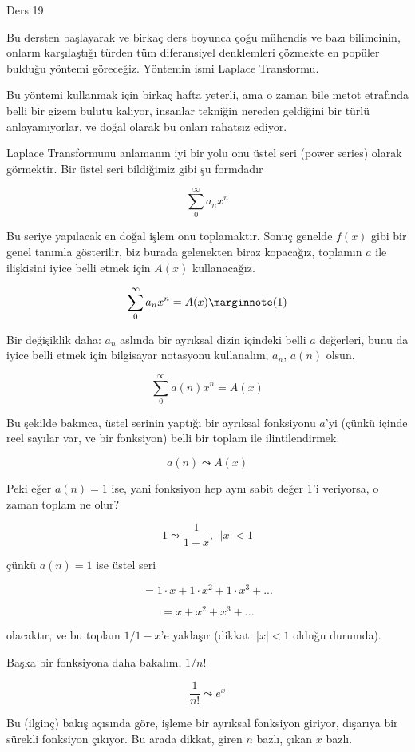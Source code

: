 \documentclass[12pt,fleqn]{article}\usepackage{../../common}
\begin{document}
Ders 19 

Bu dersten başlayarak ve birkaç ders boyunca çoğu mühendis ve bazı
bilimcinin, onların karşılaştığı türden tüm diferansiyel denklemleri
çözmekte en popüler bulduğu yöntemi göreceğiz. Yöntemin ismi Laplace
Transformu. 

Bu yöntemi kullanmak için birkaç hafta yeterli, ama o zaman bile metot
etrafında belli bir gizem bulutu kalıyor, insanlar tekniğin nereden
geldiğini bir türlü anlayamıyorlar, ve doğal olarak bu onları rahatsız
ediyor.  

Laplace Transformunu anlamanın iyi bir yolu onu üstel seri (power series)
olarak görmektir. Bir üstel seri bildiğimiz gibi şu formdadır

$$ \sum_{0}^{\infty} a_n x^n $$

Bu seriye yapılacak en doğal işlem onu toplamaktır. Sonuç genelde $f(x)$
gibi bir genel tanımla gösterilir, biz burada gelenekten biraz kopacağız,
toplamın $a$ ile ilişkisini iyice belli etmek için $A(x)$ kullanacağız. 

$$ \sum_{0}^{\infty} a_n x^n = A(x)
\mlabel{1}
$$

Bir değişiklik daha: $a_n$ aslında bir ayrıksal dizin içindeki belli $a$
değerleri, bunu da iyice belli etmek için bilgisayar notasyonu kullanalım,
$a_n$, $a(n)$ olsun. 

$$ \sum_{0}^{\infty} a(n) x^n = A(x)$$

Bu şekilde bakınca, üstel serinin yaptığı bir ayrıksal fonksiyonu $a$'yi
(çünkü içinde reel sayılar var, ve bir fonksiyon) belli bir toplam ile
ilintilendirmek. 

$$ a(n) \leadsto A(x) $$

Peki eğer $a(n) = 1$ ise, yani fonksiyon hep aynı sabit değer 1'i
veriyorsa, o zaman toplam ne olur? 

$$ 1 \leadsto \frac{1}{1-x}, \ \ |x|<1 $$

çünkü $a(n) = 1$ ise üstel seri 

$$ = 1 \cdot x + 1 \cdot x^2 + 1 \cdot x^3 + ... $$

$$ = x + x^2 + x^3 + ... $$

olacaktır, ve bu toplam $1/1-x$'e yaklaşır (dikkat: $|x|<1$ olduğu durumda).

Başka bir fonksiyona daha bakalım, $1 / n!$ 

$$ \frac{1}{n!} \leadsto e^x $$

Bu (ilginç) bakış açısında göre, işleme bir ayrıksal fonksiyon giriyor,
dışarıya bir sürekli fonksiyon çıkıyor. Bu arada dikkat, giren $n$ bazlı, çıkan $x$
bazlı. 
\end{document}
